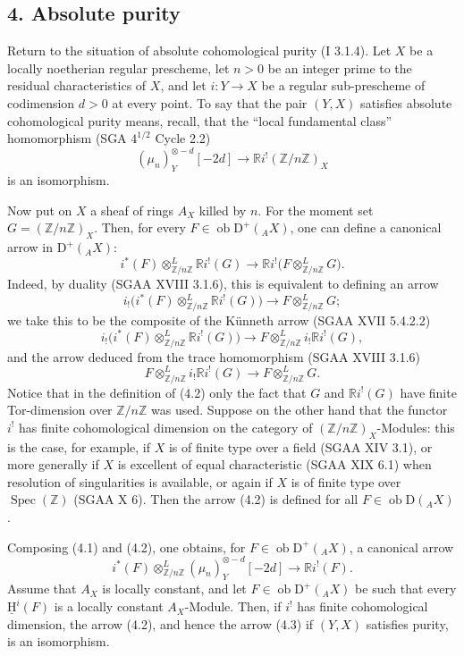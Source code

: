 \documentclass[11pt]{article}
\providecommand{\uH}{\underline{\mathrm H}}
\DeclareMathOperator{\Spec}{Spec}
\newcommand{\D}{\mathrm{D}}
\newcommand{\Z}{\mathbb{Z}}
\newcommand{\ob}{\operatorname{ob}}
\providecommand{\ob}{\operatorname{ob}}
\providecommand{\Z}{\mathbb Z}
\providecommand{\Spec}{\operatorname{Spec}}
\providecommand{\Spec}{\operatorname{Spec}}
\providecommand{\Spec}{\operatorname{Spec}}
\providecommand{\Spec}{\operatorname{Spec}}
\begin{document}
\subsection*{4. Absolute purity}

Return to the situation of absolute cohomological purity (I 3.1.4). Let $X$ be a locally noetherian regular prescheme, let $n>0$ be an integer prime to the residual characteristics of $X$, and let $i:Y\to X$ be a regular sub-prescheme of codimension $d>0$ at every point. To say that the pair $(Y,X)$ satisfies absolute cohomological purity means, recall, that the ``local fundamental class'' homomorphism (SGA $4^{1/2}$ Cycle 2.2)
\begin{equation}\tag{4.1}
        (\mu_n)_Y^{\otimes -d}[-2d]\longrightarrow \mathbb{R} i^!(\Z/n\Z)_X
\end{equation}
is an isomorphism.

Now put on $X$ a sheaf of rings $A_X$ killed by $n$. For the moment set $G=(\Z/n\Z)_X$. Then, for every $F\in\ob\D^+({}_A X)$, one can define a canonical arrow in $\D^+({}_A X)$:
\begin{equation}\tag{4.2}
        i^*(F)\otimes^L_{\Z/n\Z} \mathbb{R} i^!(G)\longrightarrow \mathbb{R} i^!\bigl(F\otimes^L_{\Z/n\Z}G\bigr).
\end{equation}
Indeed, by duality (SGAA XVIII 3.1.6), this is equivalent to defining an arrow
\[
        i_!\bigl(i^*(F)\otimes^L_{\Z/n\Z}\mathbb{R} i^!(G)\bigr)\longrightarrow F\otimes^L_{\Z/n\Z}G;
\]
we take this to be the composite of the Künneth arrow (SGAA XVII 5.4.2.2)
\[
        i_!\bigl(i^*(F)\otimes^L_{\Z/n\Z}\mathbb{R} i^!(G)\bigr)\longrightarrow F\otimes^L_{\Z/n\Z}i_!\mathbb{R} i^!(G),
\]
and the arrow deduced from the trace homomorphism (SGAA XVIII 3.1.6)
\[
        F\otimes^L_{\Z/n\Z}i_!\mathbb{R} i^!(G)\longrightarrow F\otimes^L_{\Z/n\Z}G.
\]
Notice that in the definition of (4.2) only the fact that $G$ and $\mathbb{R} i^!(G)$ have finite Tor-dimension over $\Z/n\Z$ was used. Suppose on the other hand that the functor $i^!$ has finite cohomological dimension on the category of $(\Z/n\Z)_X$-Modules: this is the case, for example, if $X$ is of finite type over a field (SGAA XIV 3.1), or more generally if $X$ is excellent of equal characteristic (SGAA XIX 6.1) when resolution of singularities is available, or again if $X$ is of finite type over $\Spec(\Z)$ (SGAA X 6). Then the arrow (4.2) is defined for all $F\in\ob\D({}_A X)$.

Composing (4.1) and (4.2), one obtains, for $F\in\ob\D^+({}_A X)$, a canonical arrow
\begin{equation}\tag{4.3}
        i^*(F)\otimes^L_{\Z/n\Z}(\mu_n)_Y^{\otimes -d}[-2d]\longrightarrow \mathbb{R} i^!(F).
\end{equation}
Assume that $A_X$ is locally constant, and let $F\in\ob\D^+({}_A X)$ be such that every $\uH^i(F)$ is a locally constant $A_X$-Module. Then, if $i^!$ has finite cohomological dimension, the arrow (4.2), and hence the arrow (4.3) if $(Y,X)$ satisfies purity, is an isomorphism.
\end{document}
